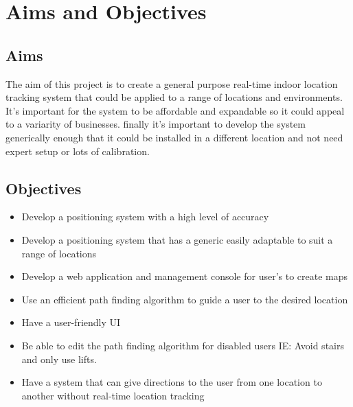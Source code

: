 \section{Aims and Objectives}
		\subsection{Aims}
		The aim of this project is to create a general purpose real-time indoor location tracking system that could be applied to a range of locations and environments. It's important for the system  to be affordable and expandable so it could appeal to a variarity of businesses. finally it's important to develop the system generically enough that it could be installed in a different location and not need expert setup or lots of calibration.

		\subsection{Objectives}
		\begin{itemize}
			\item Develop a positioning system with a high level of accuracy
			\item Develop a positioning system that has a generic easily adaptable to suit a range of locations
			\item Develop a web application and management console for user’s to create maps
			\item Use an efficient path finding algorithm to guide a user to the desired location
			\item Have a user-friendly UI
			\item Be able to edit the path finding algorithm for disabled users IE: Avoid stairs and only use lifts.
			\item Have a system that can give directions to the user from one location to another without real-time location tracking
		\end{itemize}
		\newpage